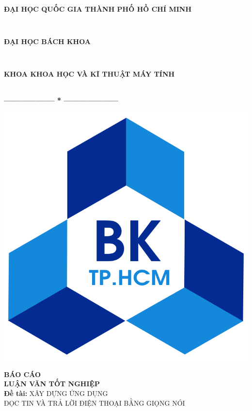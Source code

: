 \documentclass[a4paper,12pt,oneside]{article}
\begin{document}
\thispagestyle{empty}
\begin{center}
\begin{large}
\textbf{ĐẠI HỌC QUỐC GIA THÀNH PHỐ HỒ CHÍ MINH}
\end{large} \\
\begin{large}
\textbf{ĐẠI HỌC BÁCH KHOA}
\end{large} \\
\begin{large}
\textbf{KHOA KHOA HỌC VÀ KĨ THUẬT MÁY TÍNH}
\end{large} \\
\textbf{--------------------  *  ---------------------}\\[1.5cm]
\begin{center}
\includegraphics[scale=.2]{hinh/logo.png}
\end{center}

{\fontsize{26pt}{1}\selectfont \textbf{BÁO CÁO}}\\
{\fontsize{26pt}{1}\selectfont \textbf{LUẬN VĂN TỐT NGHIỆP}}\\[0.5cm]

{\fontsize{24pt}{1}\selectfont \textbf{Đề tài:} XÂY DỰNG ỨNG DỤNG\\
							ĐỌC TIN VÀ TRẢ LỜI ĐIỆN THOẠI BẰNG GIỌNG NÓI}\\[1.75cm]
\end{center}
\end{document}
